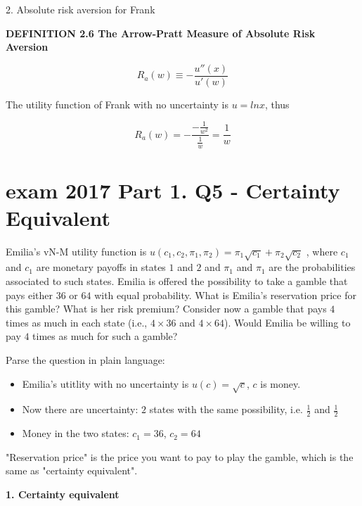 \documentclass{article}
\begin{document}
2. Absolute risk aversion for Frank

\begin{mdframed}[backgroundcolor=blue!20,linecolor=white]
\textbf{DEFINITION 2.6 The Arrow-Pratt Measure of Absolute Risk Aversion}

$$R_a(w) \equiv -\frac{u''(x)}{u'(w)}$$

\end{mdframed}


The utility function of Frank with no uncertainty is $u = ln x$, thus

$$R_a(w) = -\frac{-\frac{1}{w^2}}{\frac{1}{w}}=\frac{1}{w}$$

\newpage 

\section{exam 2017 Part 1. Q5 - Certainty Equivalent}

Emilia's vN-M utility function is $u(c_1,c_2,\pi_1, \pi_2) = \pi_1 \sqrt{c_1} + \pi_2 \sqrt{c_2}$
, where $c_1$ and $c_1$ are
monetary payoffs in states $1$ and $2$ and $\pi_1$ and $\pi_1$ are the probabilities associated to such states.
Emilia is offered the possibility to take a gamble that pays either $36$ or $64$ with equal probability.
What is Emilia’s reservation price for this gamble? What is her risk premium?
Consider now a gamble that pays $4$ times as much in each state (i.e., $4 \times 36$ and $4 \times 64$). Would
Emilia be willing to pay $4$ times as much for such a gamble? 


\begin{mdframed}[backgroundcolor=blue!20,linecolor=white]
Parse the question in plain language:

\begin{itemize}
\item Emilia's utitlity with no uncertainty is $u(c) = \sqrt{c}$, $c$ is money.
\item Now there are uncertainty: $2$ states with the same possibility, i.e. $\frac{1}{2}$ and $\frac{1}{2}$
\item Money in the two states: $c_1 = 36$, $c_2 = 64$

\end{itemize}

"Reservation price" is the price you want to pay to play the gamble, which is the same as "certainty equivalent".
\end{mdframed}

\textbf{1. Certainty equivalent}
\end{document}
